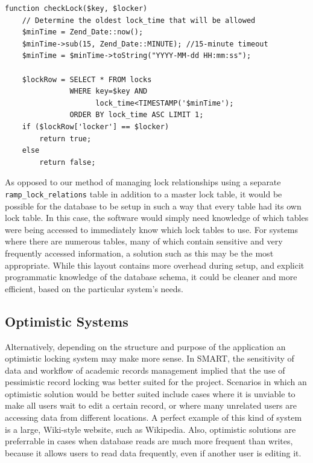 \documentclass[12pt]{article}
\newcommand{\code}[1]{\texttt{#1}}
\begin{document}
\begin{framed}
\begin{spacing}{1.0}
\begin{verbatim}
function checkLock($key, $locker)
    // Determine the oldest lock_time that will be allowed
    $minTime = Zend_Date::now();
    $minTime->sub(15, Zend_Date::MINUTE); //15-minute timeout
    $minTime = $minTime->toString("YYYY-MM-dd HH:mm:ss");

    $lockRow = SELECT * FROM locks
               WHERE key=$key AND
                     lock_time<TIMESTAMP('$minTime');
               ORDER BY lock_time ASC LIMIT 1;
    if ($lockRow['locker'] == $locker)
        return true;
    else
        return false;

\end{verbatim}
\end{spacing}
\end{framed}

As opposed to our method of managing lock relationships using a separate \code{ramp\_lock\_relations} table in addition to a master lock table, it would be possible for the database to be setup in such a way that every table had its own lock table. In this case, the software would simply need knowledge of which tables were being accessed to immediately know which lock tables to use. For systems where there are numerous tables, many of which contain sensitive and very frequently accessed information, a solution such as this may be the most appropriate. While this layout contains more overhead during setup, and explicit programmatic knowledge of the database schema, it could be cleaner and more efficient, based on the particular system's needs.

\newpage
\subsection{Optimistic Systems}
Alternatively, depending on the structure and purpose of the application an optimistic locking system may make more sense. In SMART, the sensitivity of data and workflow of academic records management implied that the use of pessimistic record locking was better suited for the project. Scenarios in which an optimistic solution would be better suited include cases where it is unviable to make all users wait to edit a certain record, or where many unrelated users are accessing data from different locations. A perfect example of this kind of system is a large, Wiki-style website, such as Wikipedia. Also, optimistic solutions are preferrable in cases when database reads are much more frequent than writes, because it allows users to read data frequently, even if another user is editing it. 
\end{document}
